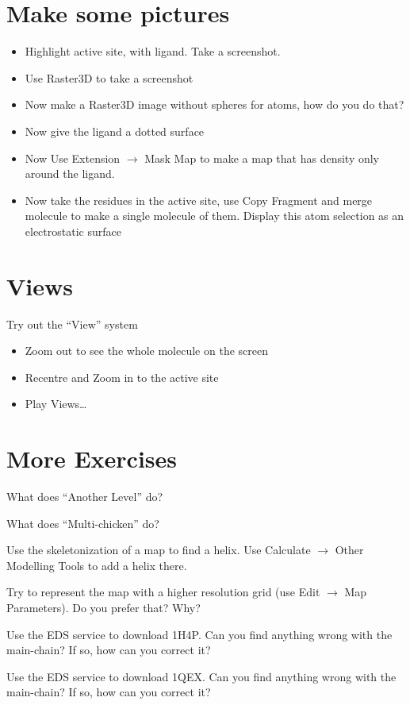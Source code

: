 \documentclass{article}
\begin{document}
\section{Make some pictures}


  \begin{itemize}
    \item Highlight active site, with ligand.  Take a screenshot.
    \item Use Raster3D to take a screenshot
    \item Now make a Raster3D image without spheres for atoms, how do
      you do that?
    \item Now give the ligand a dotted surface
    \item Now Use \textsf{Extension $\rightarrow$ Mask Map} to make a
      map that has density only around the ligand.
    \item Now take the residues in the active site, use Copy Fragment
      and merge molecule to make a single molecule of them. Display
      this atom selection as an electrostatic surface
  \end{itemize}

\section{Views}

Try out the ``View'' system
\begin{itemize}
\item Zoom out to see the whole molecule on the screen
\item Recentre and Zoom in to the active site
\item Play Views\ldots
\end{itemize}


\section{More Exercises}
\begin{trivlist}
\item What does ``Another Level'' do? 
\item What does ``Multi-chicken'' do?
\item Use the skeletonization of a map to find a helix.  Use
  \textsf{Calculate $\rightarrow$ Other Modelling Tools} to add a
  helix there.
\item Try to represent the map with a higher resolution grid (use
  \textsf{Edit $\rightarrow$ Map Parameters}).  Do you prefer that?
  Why?
\item Use the EDS service to download 1H4P.  Can you find anything
  wrong with the main-chain?  If so, how can you correct it?
\item Use the EDS service to download 1QEX.  Can you find anything
  wrong with the main-chain?  If so, how can you correct it?
\end{trivlist}
\end{document}
